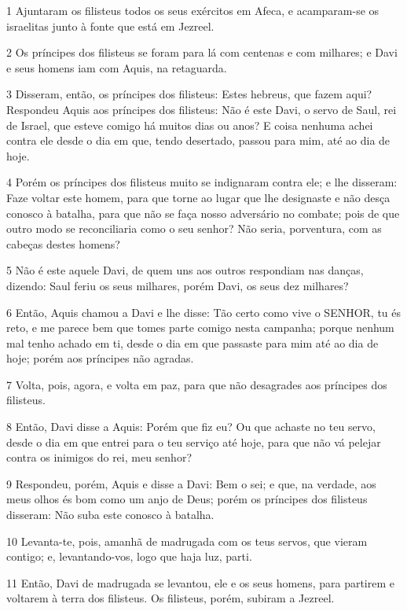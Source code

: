 \par 1 Ajuntaram os filisteus todos os seus exércitos em Afeca, e acamparam-se os israelitas junto à fonte que está em Jezreel.
\par 2 Os príncipes dos filisteus se foram para lá com centenas e com milhares; e Davi e seus homens iam com Aquis, na retaguarda.
\par 3 Disseram, então, os príncipes dos filisteus: Estes hebreus, que fazem aqui? Respondeu Aquis aos príncipes dos filisteus: Não é este Davi, o servo de Saul, rei de Israel, que esteve comigo há muitos dias ou anos? E coisa nenhuma achei contra ele desde o dia em que, tendo desertado, passou para mim, até ao dia de hoje.
\par 4 Porém os príncipes dos filisteus muito se indignaram contra ele; e lhe disseram: Faze voltar este homem, para que torne ao lugar que lhe designaste e não desça conosco à batalha, para que não se faça nosso adversário no combate; pois de que outro modo se reconciliaria como o seu senhor? Não seria, porventura, com as cabeças destes homens?
\par 5 Não é este aquele Davi, de quem uns aos outros respondiam nas danças, dizendo: Saul feriu os seus milhares, porém Davi, os seus dez milhares?
\par 6 Então, Aquis chamou a Davi e lhe disse: Tão certo como vive o SENHOR, tu és reto, e me parece bem que tomes parte comigo nesta campanha; porque nenhum mal tenho achado em ti, desde o dia em que passaste para mim até ao dia de hoje; porém aos príncipes não agradas.
\par 7 Volta, pois, agora, e volta em paz, para que não desagrades aos príncipes dos filisteus.
\par 8 Então, Davi disse a Aquis: Porém que fiz eu? Ou que achaste no teu servo, desde o dia em que entrei para o teu serviço até hoje, para que não vá pelejar contra os inimigos do rei, meu senhor?
\par 9 Respondeu, porém, Aquis e disse a Davi: Bem o sei; e que, na verdade, aos meus olhos és bom como um anjo de Deus; porém os príncipes dos filisteus disseram: Não suba este conosco à batalha.
\par 10 Levanta-te, pois, amanhã de madrugada com os teus servos, que vieram contigo; e, levantando-vos, logo que haja luz, parti.
\par 11 Então, Davi de madrugada se levantou, ele e os seus homens, para partirem e voltarem à terra dos filisteus. Os filisteus, porém, subiram a Jezreel.

